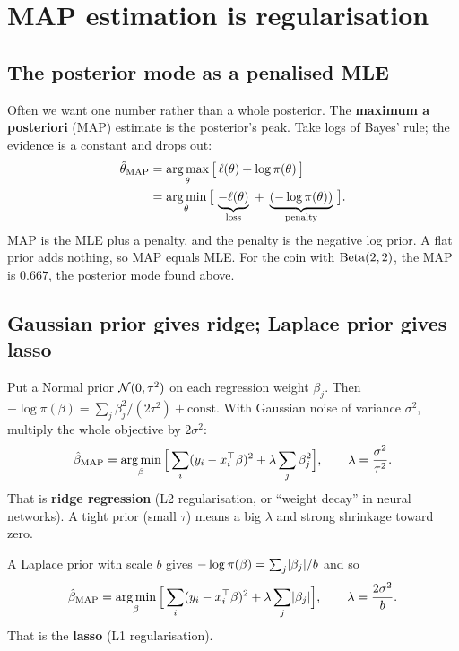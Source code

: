 \section{MAP estimation is regularisation}
\label{sec:lik-map}

\subsection{The posterior mode as a penalised MLE}

Often we want one number rather than a whole posterior. The \textbf{maximum a
posteriori} (MAP) estimate is the posterior's peak. Take logs of Bayes' rule; the
evidence is a constant and drops out:
\begin{align*}
  \hat\theta_{\text{MAP}} &= \operatorname*{arg\,max}_\theta\big[\,\ell(\theta) + \log\pi(\theta)\,\big] \\
  &= \operatorname*{arg\,min}_\theta\big[\,\underbrace{-\ell(\theta)}_{\text{loss}}
  \;+\; \underbrace{(-\log\pi(\theta))}_{\text{penalty}}\,\big].
\end{align*}
MAP is the MLE plus a penalty, and the penalty is the negative log prior. A flat prior
adds nothing, so MAP equals MLE. For the coin with $\operatorname{Beta}(2,2)$, the MAP is $0.667$, the
posterior mode found above.

\subsection{Gaussian prior gives ridge; Laplace prior gives lasso}

Put a Normal prior $\mathcal{N}(0,\tau^2)$ on each regression weight $\beta_j$. Then
$-\log\pi(\beta) = \sum_j\beta_j^2/(2\tau^2) + \text{const}$. With Gaussian noise of
variance $\sigma^2$, multiply the whole objective by $2\sigma^2$:
\[
  \hat\beta_{\text{MAP}} = \operatorname*{arg\,min}_\beta \Big[\sum_i (y_i - x_i^\top\beta)^2
  + \lambda\sum_j \beta_j^2\Big], \qquad \lambda = \frac{\sigma^2}{\tau^2}.
\]
That is \textbf{ridge regression} (L2 regularisation, or ``weight decay'' in neural
networks). A tight prior (small $\tau$) means a big $\lambda$ and strong shrinkage
toward zero.

A Laplace prior with scale $b$ gives $-\log\pi(\beta) = \sum_j\lvert\beta_j\rvert/b$ and so
\[
  \hat\beta_{\text{MAP}} = \operatorname*{arg\,min}_\beta \Big[\sum_i (y_i - x_i^\top\beta)^2
  + \lambda\sum_j \lvert\beta_j\rvert\Big], \qquad \lambda = \frac{2\sigma^2}{b} .
\]
That is the \textbf{lasso} (L1 regularisation).

